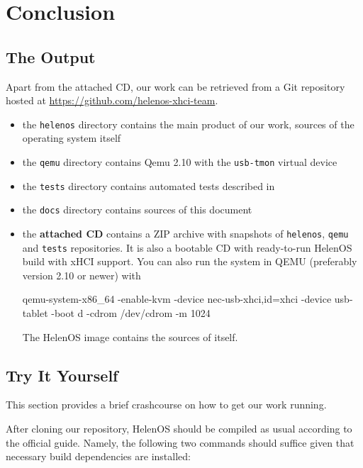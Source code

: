 \chapter*{Conclusion}


\section{The Output} %

Apart from the attached CD, our work can be retrieved from a Git repository
hosted at \href{https://github.com/helenos-xhci-team}{https://github.com/helenos-xhci-team}.

\begin{itemize}
\item the \texttt{helenos} directory contains the main product of our work,
sources of the operating system itself
\item the \texttt{qemu} directory contains Qemu 2.10 with the \texttt{usb-tmon} virtual device
\item the \texttt{tests} directory contains automated tests described in 
\item the \texttt{docs} directory contains sources of this document
\item the \textbf{attached CD} contains a ZIP archive with snapshots of \texttt{helenos},
\texttt{qemu} and \texttt{tests} repositories. It is also a bootable CD with
ready-to-run HelenOS build with xHCI support. You can also run the system in
QEMU (preferably version 2.10 or newer) with
\begin{bdsh}
qemu-system-x86_64 -enable-kvm -device nec-usb-xhci,id=xhci -device usb-tablet -boot d -cdrom /dev/cdrom -m 1024
\end{bdsh}
The HelenOS image contains the sources of itself.
\end{itemize}


\section{Try It Yourself}

This section provides a brief crashcourse on how to get our work running.

After cloning our repository, HelenOS should be compiled as usual according to
the official guide. Namely, the following two commands should suffice given
that necessary build dependencies are installed:


